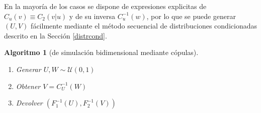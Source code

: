 \documentclass[
]{book}
\theoremstyle{break}
\newtheorem{conjecture}{Algoritmo}[chapter]
\theoremstyle{nonumberplain}
\begin{document}
En la mayoría de los casos se dispone de expresiones explicitas de \(C_{u}(v)\equiv C_2\left( \left. v\right \vert u\right)\) y de su inversa \(C_{u}^{-1}(w)\), por lo que se puede generar \((U,V)\) fácilmente mediante el método secuencial de distribuciones condicionadas descrito en la Sección \ref{distrcond}.

\begin{conjecture}[de simulación bidimensional mediante cópulas]
\protect\hypertarget{cnj:copula-bidim}{}\label{cnj:copula-bidim}

\begin{enumerate}
\def\labelenumi{\arabic{enumi}.}
\item
  Generar \(U,W\sim \mathcal{U}(0,1)\)
\item
  Obtener \(V=C_{U}^{-1}(W)\)
\item
  Devolver \(\left( F_1^{-1}(U),F_2^{-1}(V)\right)\)
\end{enumerate}

\end{conjecture}
\end{document}
